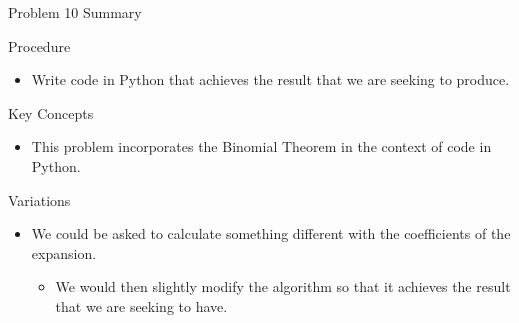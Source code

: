 \begin{summary}{Problem 10 Summary}
    \begin{statement}{Procedure}
        \begin{itemize}
            \item Write code in Python that achieves the result that we are seeking to produce.
        \end{itemize}
    \end{statement}
    \begin{statement}{Key Concepts}
        \begin{itemize}
            \item This problem incorporates the Binomial Theorem in the context of code in Python.
        \end{itemize}
    \end{statement}
    \begin{statement}{Variations}
        \begin{itemize}
            \item We could be asked to calculate something different with the coefficients of the expansion.
            \begin{itemize}
                \item We would then slightly modify the algorithm so that it achieves the result that we are seeking to have.
            \end{itemize}
        \end{itemize}
    \end{statement}
\end{summary}
